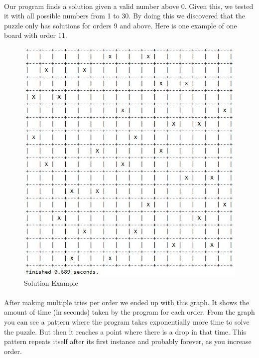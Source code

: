 \documentclass[runningheads]{llncs}
\begin{document}
\paragraph{}
Our program finds a solution given a valid number above 0. Given this, we tested it with all possible numbers from 1 to 30.
By doing this we discovered that the puzzle only has solutions for orders 9 and above. Here is one example of one board with order 11.

\begin{figure}
    \begin{center}
        \includegraphics[scale=0.35]{images/gap9.jpg}
        \caption{Solution Example} \label{fig3}
    \end{center}
\end{figure}

\pagebreak

\paragraph{}
After making multiple tries per order we ended up with this graph. It shows the amount of time (in seconds) taken by the program for
each order. From the graph you can see a pattern where the program takes exponentially more time to solve the puzzle. But then it
reaches a point where there is a drop in that time. This pattern repeats itself after its first instance and probably forever, as you increase order.
\end{document}
